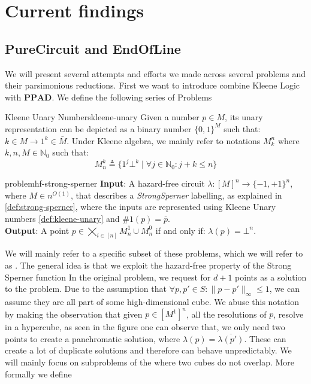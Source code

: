 
\section{Current findings}
\label{sec:findings}

\subsection{PureCircuit and EndOfLine}
We will present several attempts and efforts we made across several problems and their
parsimonious reductions. First we want to introduce combine Kleene Logic with $\textbf{PPAD}$.
We define the following series of Problems


\begin{definitionbox}{Kleene Unary Numbers}{kleene-unary}
    \label{def:kleene-unary}
    Given a number $p \in M$, its unary representation can be depicted as a binary number $\{0,1\}^M$ such that: $k \in M \to 1^k \in \bar{M}$.
    Under Kleene algebra, we mainly refer to notations $M_k^n$ where $k,n,M \in \mathbb{N}_0$  such that:
    $$
        M^k_n \triangleq \{1^j\bot^k \mid \forall j \in \mathbb{N}_0 : j + k \leq n\}
    $$
\end{definitionbox}



\begin{definitionbox}{ problem}{hf-strong-sperner}
    \textbf{Input}: A hazard-free circuit $\lambda: [M]^n \to \{-1, +1\}^n$, where $M \in n^{O(1)}$, that describes a \textit{StrongSperner} labelling,
    as explained in \ref{def:strong-sperner}, where the inputs are represented using Kleene Unary numbers \ref{def:kleene-unary}
    and $\#1(p) = \bar{p}$.\\
    \textbf{Output}: A point $p \in \bigtimes_{i \in [n]} M^1_n \cup M^0_n$ if and only if: $\lambda(p) =  \bot^n$.
\end{definitionbox}

We will mainly refer to a specific subset of these problems, which we will refer to as .
The general idea is that we exploit the hazard-free property of the Strong Sperner function
In the original problem, we request for $d+1$ points as a solution to the problem. Due
to the assumption that $\forall p, p' \in S: \|p-p'\|_{\infty} \leq 1$, we can assume
they are all part of some high-dimensional cube. We abuse this notation by making the observation
that given $p \in [M^1]^n$, all the resolutions of $p$, resolve in a hypercube, as seen in the figure
one can observe that, we only need two points to create a panchromatic solution, where $\lambda(p) = \overline{\lambda(p')}$. These can create a lot of duplicate
solutions and therefore can behave unpredictably. We will mainly focus on subproblems of the  where two cubes do not overlap.
More formally we define


